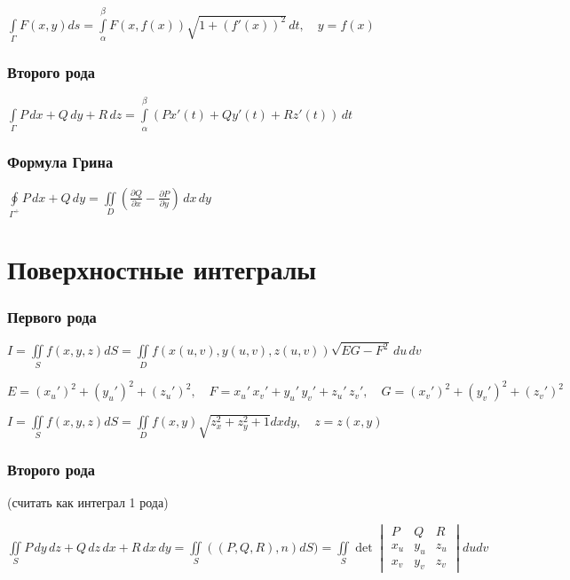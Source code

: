 $\int\limits_{\Gamma} F(x,y) ds = \int\limits_{\alpha}^{\beta} F(x,f(x))\sqrt{1+(f'(x))^2}\,dt, \quad y=f(x)$

\subsubsection{Второго рода}
$\int\limits_{\Gamma} P\,dx+Q\,dy+R\,dz=\int\limits_{\alpha}^{\beta} \left(P x'(t)+ Q y'(t)+ R z'(t)\right)\,dt$

\subsubsection{Формула Грина}
$\oint\limits_{\Gamma ^{+}} P \,dx + Q \,dy = \iint\limits_{D} \left( \frac{\partial Q}{\partial x} - \frac{\partial P}{\partial y} \right) \,dx\,dy$

\section{Поверхностные интегралы}
\subsubsection{Первого рода} 
${ I=\iint \limits _{S}{f\left(x, y, z\right)dS }=\iint \limits _{D}{f\left(x\left(u,v\right),y\left(u,v\right),z\left(u,v\right)\right){\sqrt {EG-F^{2}}}\,du\,dv}}$

${ E=\left(x_{u}'\right)^{2}+\left(y_{u}'\right)^{2}+\left(z_{u}'\right)^{2}}, \quad {F=x_{u}'\,x_{v}'+y_{u}'\,y_{v}'+z_{u}'\,z_{v}'}, \quad { G=\left(x_{v}'\right)^{2}+\left(y_{v}'\right)^{2}+\left(z_{v}'\right)^{2}}$

$ I=\iint \limits _{S}{f\left(x, y, z\right)dS } = \iint \limits _{D} f(x,y) \sqrt {z_x^2 + z_y^2 + 1}dxdy, \quad z=z(x, y) $

\subsubsection{Второго рода} 

\qquad  \qquad  \qquad \qquad \qquad \qquad \qquad \qquad \qquad (считать как интеграл 1 рода)

${\iint \limits _{S }{P\,dy\,dz+Q\,dz\,dx+R\,dx\,dy}} = {\iint \limits _{S }{((P,Q,R),n)}dS}) = \iint \limits _{S}{\det \begin{vmatrix}P&Q&R\\x_u&y_u&z_u\\x_v&y_v&z_v\end{vmatrix}}dudv$


